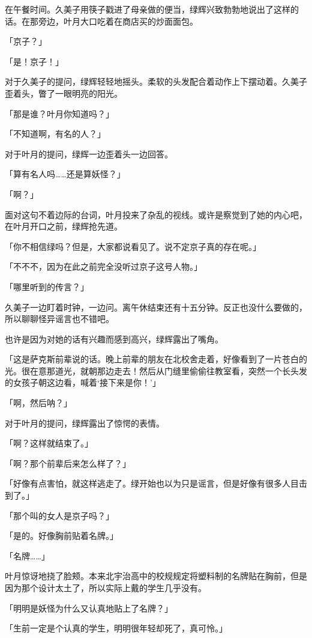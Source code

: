 \documentclass[UTF8]{ctexart}
\begin{document}
    在午餐时间。久美子用筷子戳进了母亲做的便当，绿辉兴致勃勃地说出了这样的话。在那旁边，叶月大口吃着在商店买的炒面面包。

    「京子？」

    「是！京子！」

    对于久美子的提问，绿辉轻轻地摇头。柔软的头发配合着动作上下摆动着。久美子歪着头，瞥了一眼明亮的阳光。

    「那是谁？叶月你知道吗？」

    「不知道啊，有名的人？」

    对于叶月的提问，绿辉一边歪着头一边回答。

    「算有名人吗……还是算妖怪？」

    「啊？」

    面对这句不着边际的台词，叶月投来了杂乱的视线。或许是察觉到了她的内心吧，在叶月开口之前，绿辉抢先道。

    「你不相信绿吗？但是，大家都说看见了。说不定京子真的存在呢。」

    「不不不，因为在此之前完全没听过京子这号人物。」

    「哪里听到的传言？」

    久美子一边盯着时钟，一边问。离午休结束还有十五分钟。反正也没什么要做的，所以聊聊怪异谣言也不错吧。

    也许是因为对她的话有兴趣而感到高兴，绿辉露出了嘴角。

    「这是萨克斯前辈说的话。晚上前辈的朋友在北校舍走着，好像看到了一片苍白的光。很在意那道光，就朝那边走去！然后从门缝里偷偷往教室看，突然一个长头发的女孩子朝这边看，喊着‘接下来是你！’」

    「啊，然后呐？」

    对于叶月的提问，绿辉露出了惊愕的表情。

    「啊？这样就结束了。」

    「啊？那个前辈后来怎么样了？」

    「好像有点害怕，就这样逃走了。绿开始也以为只是谣言，但是好像有很多人目击到了。」

    「那个叫的女人是京子吗？」

    「是的。好像胸前贴着名牌。」

    「名牌……」

    叶月惊讶地挠了脸颊。本来北宇治高中的校规规定将塑料制的名牌贴在胸前，但是因为那个设计太土了，所以实际上戴的学生几乎没有。

    「明明是妖怪为什么又认真地贴上了名牌？」

    「生前一定是个认真的学生，明明很年轻却死了，真可怜。」
\end{document}
